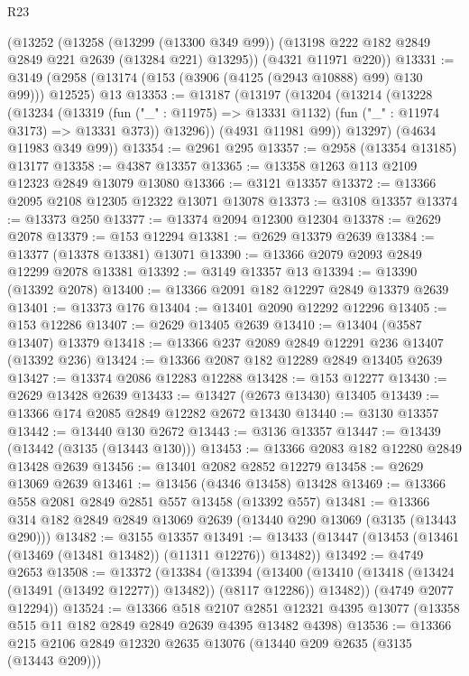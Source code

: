 \begin{lexlean}{R23}
\begin{coremodule}
    (@13252
      (@13258
        (@13299 (@13300 @349 @99))
        (@13198 @222 @182 @2849 @2849 @221 @2639 (@13284 @221) @13295))
      (@4321 @11971 @220))
@13331 := @3149 (@2958 (@13174 (@153 (@3906 (@4125 (@2943 @10888) @99) @130 @99))) @12525) @13
@13353 := @13187
    (@13197
      (@13204
        (@13214
          (@13228
            (@13234
              (@13319
                (fun ("_" : @11975) => @13331 @1132)
                (fun ("_" : @11974 @3173) => @13331 @373))
              @13296))
          (@4931 @11981 @99))
        @13297)
      (@4634 @11983 @349 @99))
@13354 := @2961 @295
@13357 := @2958 (@13354 @13185) @13177
@13358 := @4387 @13357
@13365 := @13358 @1263 @113 @2109 @12323 @2849 @13079 @13080
@13366 := @3121 @13357
@13372 := @13366 @2095 @2108 @12305 @12322 @13071 @13078
@13373 := @3108 @13357
@13374 := @13373 @250
@13377 := @13374 @2094 @12300 @12304
@13378 := @2629 @2078
@13379 := @153 @12294
@13381 := @2629 @13379 @2639
@13384 := @13377 (@13378 @13381) @13071
@13390 := @13366 @2079 @2093 @2849 @12299 @2078 @13381
@13392 := @3149 @13357 @13
@13394 := @13390 (@13392 @2078)
@13400 := @13366 @2091 @182 @12297 @2849 @13379 @2639
@13401 := @13373 @176
@13404 := @13401 @2090 @12292 @12296
@13405 := @153 @12286
@13407 := @2629 @13405 @2639
@13410 := @13404 (@3587 @13407) @13379
@13418 := @13366 @237 @2089 @2849 @12291 @236 @13407 (@13392 @236)
@13424 := @13366 @2087 @182 @12289 @2849 @13405 @2639
@13427 := @13374 @2086 @12283 @12288
@13428 := @153 @12277
@13430 := @2629 @13428 @2639
@13433 := @13427 (@2673 @13430) @13405
@13439 := @13366 @174 @2085 @2849 @12282 @2672 @13430
@13440 := @3130 @13357
@13442 := @13440 @130 @2672
@13443 := @3136 @13357
@13447 := @13439 (@13442 (@3135 (@13443 @130)))
@13453 := @13366 @2083 @182 @12280 @2849 @13428 @2639
@13456 := @13401 @2082 @2852 @12279
@13458 := @2629 @13069 @2639
@13461 := @13456 (@4346 @13458) @13428
@13469 := @13366 @558 @2081 @2849 @2851 @557 @13458 (@13392 @557)
@13481 := @13366 @314 @182 @2849 @2849 @13069 @2639 (@13440 @290 @13069 (@3135 (@13443 @290)))
@13482 := @3155 @13357
@13491 := @13433 (@13447 (@13453 (@13461 (@13469 (@13481 @13482)) (@11311 @12276)) @13482))
@13492 := @4749 @2653
@13508 := @13372
    (@13384
      (@13394
        (@13400 (@13410 (@13418 (@13424 (@13491 (@13492 @12277)) @13482)) (@8117 @12286)) @13482))
      (@4749 @2077 @12294))
@13524 := @13366
    @518
    @2107
    @2851
    @12321
    @4395
    @13077
    (@13358 @515 @11 @182 @2849 @2849 @2639 @4395 @13482 @4398)
@13536 := @13366 @215 @2106 @2849 @12320 @2635 @13076 (@13440 @209 @2635 (@3135 (@13443 @209)))

\end{coremodule}
\end{lexlean}
